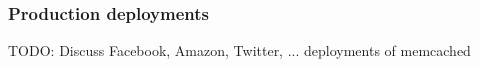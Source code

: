 \subsubsection{Production deployments}
TODO: Discuss Facebook, Amazon, Twitter, ... deployments of memcached



